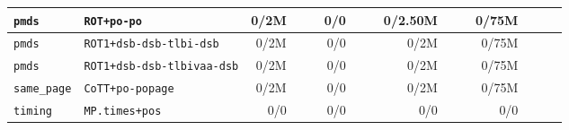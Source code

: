 \begin{tabular}{l l  | r r l | r r l | r r l | r r l l}
        \verb|pmds| &                                           \verb|ROT+po-po| &           0/2M &                       &                   &            0/0 &                       &                 &        0/2.50M &                       &                   &          0/75M &                       &                   & \\ \hline 
        \verb|pmds| &                               \verb|ROT1+dsb-dsb-tlbi-dsb| &           0/2M &                       &                   &            0/0 &                       &                 &           0/2M &                       &                   &          0/75M &                       &                   & \\ \hline 
        \verb|pmds| &                            \verb|ROT1+dsb-dsb-tlbivaa-dsb| &           0/2M &                       &                   &            0/0 &                       &                 &           0/2M &                       &                   &          0/75M &                       &                   & \\ \hline 
   \verb|same_page| &                                      \verb|CoTT+po-popage| &           0/2M &                       &                   &            0/0 &                       &                 &           0/2M &                       &                   &          0/75M &                       &                   & \\ \hline 
      \verb|timing| &                                        \verb|MP.times+pos| &            0/0 &                       &                   &            0/0 &                       &                 &            0/0 &                       &                   &            0/0 &                       &                   & \\ \hline 
\end{tabular}
